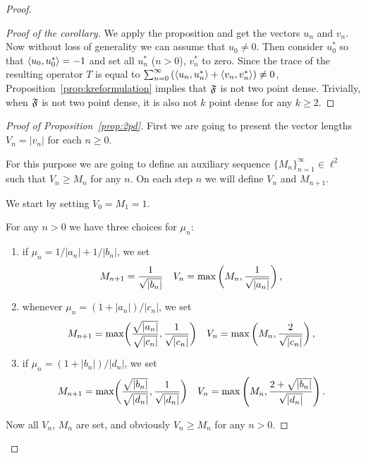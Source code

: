 \begin{proof}
\begin{proof}[Proof of the corollary]
        We apply the proposition and get the vectors $u_n$ and $v_n$.
        Now without loss of generality we can assume that $u_0 \neq 0$.
        Then consider $u^*_0$ so that $\langle u_0, u^*_0 \rangle = -1$ and set all $u^*_n$ ($n > 0$), $v^*_n$ to zero.
        Since the trace of the resulting operator $T$ is equal to $\sum_{n=0}^\infty \left(\langle u_n, u^*_n \rangle + \langle v_n, v^*_n \rangle\right) \neq 0$,
          Proposition~\ref{prop:kreformulation} implies that $\mathfrak{F}$ is not two point dense.
        Trivially, when $\mathfrak{F}$ is not two point dense, it is also not $k$ point dense for any $k \geq 2$.
      \end{proof}
      \begin{proof}[Proof of Proposition~\ref{prop:2pd}]
        First we are going to present the vector lengths $V_n = \lvert v_n \rvert$ for each $n \geq 0$.

        For this purpose we are going to define an auxiliary sequence $\{M_n\}_{n=1}^\infty \in \ell^2$ such that $V_n \geq M_n$ for any $n$.
        On each step $n$ we will define $V_n$ and $M_{n+1}$.

        We start by setting $V_0 = M_1 = 1$.

        For any $n > 0$ we have three choices for $\mu_n$:
        \begin{enumerate}
          \item if $\mu_n = 1/\lvert a_n \rvert+ 1/\lvert b_n \rvert$, we set 
              \[
                M_{n+1} = \frac{1}{\sqrt{\smash[b]{\lvert b_n \rvert}}} \quad
                V_n = \max\left(M_n, \frac{1}{\sqrt{\smash[b]{\lvert a_n \rvert}}}\right),
              \]
          \item whenever $\mu_n = (1 + \lvert a_n \rvert)/\lvert c_n \rvert$, we set 
              \[
                M_{n+1} = \max\biggl(\smash[b]{\frac{\sqrt{|a_n|}}{\sqrt{\lvert c_n \rvert}}}, \frac{1}{\sqrt{\smash[b]{\lvert c_n \rvert}}}\biggr)\quad
                V_n = \max\left(M_n, \frac{2}{\sqrt{\smash[b]{|c_n|}}}\right),
              \]
          \item if $\mu_n = (1 + \lvert b_n \rvert)/\lvert d_n \rvert$, we set 
              \[
                M_{n+1} = \max\biggl(\smash[t]{\frac{\sqrt{\lvert b_n \rvert}}{\sqrt{\lvert d_n \rvert}}}, \frac{1}{\sqrt{\smash[b]{\lvert d_n \rvert}}}\biggr)\quad
                V_n = \max\left(M_n, \frac{2 + \sqrt{\lvert b_n\rvert}}{\sqrt{\smash[b]{\lvert d_n \rvert}}}\right).
              \]
        \end{enumerate}
        Now all $V_n$, $M_n$ are set, and obviously $V_n \geq M_n$ for any $n > 0$.
        

\end{proof}
\end{proof}
